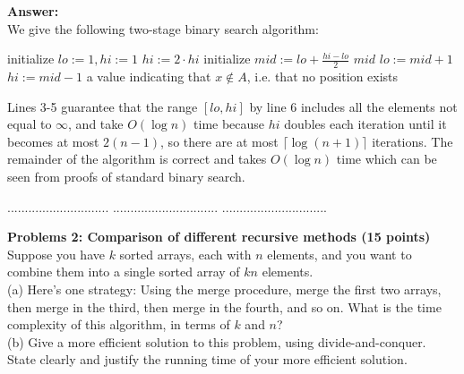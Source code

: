 \documentclass[a4paper,11pt]{article}
\begin{document}
\noindent
{\bf Answer:}\\
We give the following two-stage binary search algorithm:
\begin{algorithm}[H] {\begin{algorithmic}[1]
        \State initialize $lo := 1, hi := 1$
            \State $hi := 2 \cdot hi$
        \EndWhile
            \State initialize $mid := lo + \frac{hi - lo}{2}$
                \State \Return $mid$
                \State $lo := mid + 1$
            \Else
                \State $hi := mid - 1$
            \EndIf
        \EndWhile
        \State \Return a value indicating that $x \notin A$, i.e. that no position exists
    \EndFunction
\end{algorithmic}} \end{algorithm}
Lines 3-5 guarantee that the range $[lo, hi]$ by line 6 includes all the elements not equal to $\infty$, and take $O(\log n)$ time because $hi$ doubles each iteration until it becomes at most $2(n - 1)$, so there are at most $\lceil \log(n + 1) \rceil$ iterations. The remainder of the algorithm is correct and takes $O(\log n)$ time which can be seen from proofs of standard binary search.


\pagebreak
{} $.............................$
 $..............................$
          $..............................$\\

\bigskip\noindent
{\bf Problems 2: Comparison of different recursive methods (15 points) }\\
Suppose you have $k$ sorted arrays, each with $n$ elements, and you want
to combine them into a single sorted array of $ kn$ elements.\\
(a) Here's one strategy: Using the merge procedure, merge the first two arrays,
then merge in the third, then merge in the fourth, and so on. What is the time
complexity of this algorithm, in terms of $ k $ and $n$?\\
(b) Give a more efficient solution to this problem, using divide-and-conquer. 
State clearly and justify the running time of your more efficient solution.\\
\end{document}

